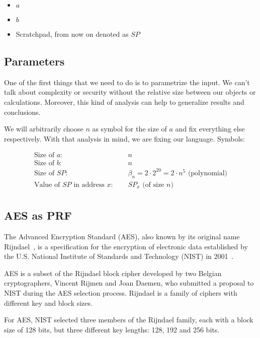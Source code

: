 \begin{itemize}
  \item $a$
  \item $b$
  \item Scratchpad, from now on denoted as $SP$
\end{itemize}

\subsection{Parameters}
One of the first things that we need to do is to parametrize the input. We can't talk about complexity or security without the relative size between our objects or calculations. Moreover, this kind of analysis can help to generalize results and conclusions.

We will arbitrarily choose $n$ as symbol for the size of $a$ and fix everything else respectively. With that analysis in mind, we are fixing our language. Symbols:

\[
  \begin{array}{lcl}
    \mbox{Size of }a \mbox{: } & \: & n \\
    \mbox{Size of }b \mbox{: } & \: & n \\
    \mbox{Size of }SP \mbox{: } & \: & \beta_{n} = 2 \cdot 2^{20} = 2 \cdot n^{5} \mbox{ (polynomial)} \\
    \mbox{Value of }SP \mbox{ in address }x \mbox{: } & \: & SP_{x} \mbox{ (of size }n\mbox{)} \\
  \end{array}
\]

\subsection{AES as PRF}
The Advanced Encryption Standard (AES), also known by its original name Rijndael~\cite{Daemen99aesproposal:}, is a specification for the encryption of electronic data established by the U.S. National Institute of Standards and Technology (NIST) in 2001~\cite{nla.cat-vn4183631}.

AES is a subset of the Rijndael block cipher developed by two Belgian cryptographers, Vincent Rijmen and Joan Daemen, who submitted a proposal to NIST during the AES selection process. Rijndael is a family of ciphers with different key and block sizes.

For AES, NIST selected three members of the Rijndael family, each with a block size of 128 bits, but three different key lengths: 128, 192 and 256 bits.

